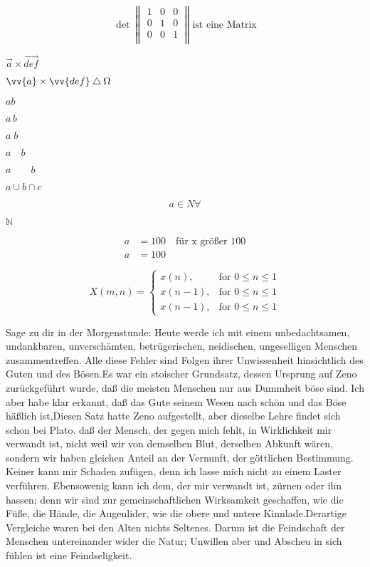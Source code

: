 \documentclass[12pt,ngerman,parskip=half]{scrartcl}
\begin{document}
\[%
\det 
\begin{Vmatrix} 
1 & 0 & 0 \\ 
0 & 1 & 0 \\ 
0 & 0 & 1 \\ 
\end{Vmatrix}
\text{ist eine Matrix}
\]

\( \vec{a} \times \vec{def} \)

\( \vv{a} \times \vv{def} \bigtriangleup \Omega  \)

\( ab \) %

\(a\,b \)

\(a\;b\)

\(a\quad b\)

\(a\qquad b\)

\(a \cup b \cap c\)

\[ a \in N \forall  \]

\(  \mathbb{N} \)


\begin{align}
a &= 100 \quad \text{für x größer 100} \\
a &= 100 
\end{align}

  \[
    X(m,n) = \left\{\begin{array}{lr}
        x(n), & \text{for } 0\leq n\leq 1\\
        x(n-1), & \text{for } 0\leq n\leq 1\\
        x(n-1), & \text{for } 0\leq n\leq 1
        \end{array}\right.
  \]


Sage zu dir in der Morgenstunde: Heute werde ich mit einem unbedachtsamen, undankbaren, unverschämten, betrügerischen, neidischen, ungeselligen Menschen zusammentreffen. Alle diese Fehler sind Folgen ihrer Unwissenheit hinsichtlich des Guten und des Bösen.Es war ein stoischer Grundsatz, dessen Ursprung auf Zeno zurückgeführt wurde, daß die meisten Menschen nur aus Dummheit böse sind. Ich aber habe klar erkannt, daß das Gute seinem Wesen nach schön und das Böse häßlich ist,Diesen Satz hatte Zeno aufgestellt, aber dieselbe Lehre findet sich schon bei Plato. daß der Mensch, der gegen mich fehlt, in Wirklichkeit mir verwandt ist, nicht weil wir von demselben Blut, derselben Abkunft wären, sondern wir haben gleichen Anteil an der Vernunft, der göttlichen Bestimmung. Keiner kann mir Schaden zufügen, denn ich lasse mich nicht zu einem Laster verführen. Ebensowenig kann ich dem, der mir verwandt ist, zürnen oder ihn hassen; denn wir sind zur gemeinschaftlichen Wirksamkeit geschaffen, wie die Füße, die Hände, die Augenlider, wie die obere und untere Kinnlade.Derartige Vergleiche waren bei den Alten nichts Seltenes. Darum ist die Feindschaft der Menschen untereinander wider die Natur; Unwillen aber und Abscheu in sich fühlen ist eine Feindseligkeit.
\end{document}
